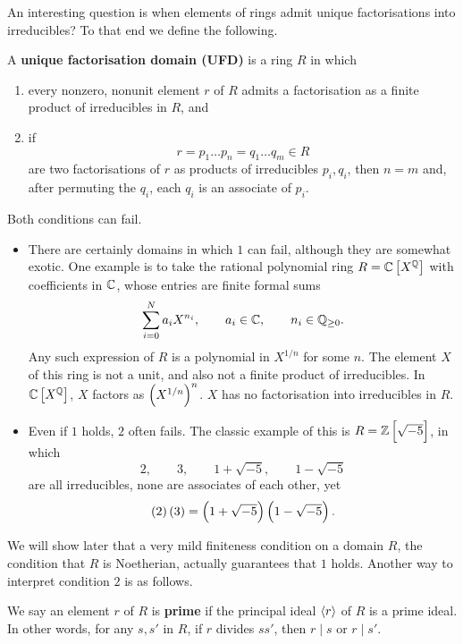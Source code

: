 An interesting question is when elements of rings admit unique factorisations into irreducibles? To that end we define the following.

\begin{definition}
A \textbf{unique factorisation domain (UFD)} is a ring $ R $ in which
\begin{enumerate}
\item every nonzero, nonunit element $ r $ of $ R $ admits a factorisation as a finite product of irreducibles in $ R $, and
\item if
$$ r = p_1 \dots p_n = q_1 \dots q_m \in R $$
are two factorisations of $ r $ as products of irreducibles $ p_i, q_i $, then $ n = m $ and, after permuting the $ q_i $, each $ q_i $ is an associate of $ p_i $.
\end{enumerate}
\end{definition}

Both conditions can fail.

\begin{example*}
\hfill
\begin{itemize}
\item There are certainly domains in which $ 1 $ can fail, although they are somewhat exotic. One example is to take the rational polynomial ring $ R = \C\sbr{X^\Q} $ with coefficients in $ \mathbb{C} $, whose entries are finite formal sums
$$ \sum_{i = 0}^N a_iX^{n_i}, \qquad a_i \in \mathbb{C}, \qquad n_i \in \mathbb{Q}_{\ge 0}. $$
Any such expression of $ R $ is a polynomial in $ X^{1 / n} $ for some $ n $. The element $ X $ of this ring is not a unit, and also not a finite product of irreducibles. In $ \C\sbr{X^\Q} $, $ X $ factors as $ \br{X^{1 / n}}^n $. $ X $ has no factorisation into irreducibles in $ R $.
\item Even if $ 1 $ holds, $ 2 $ often fails. The classic example of this is $ R = \Z\sbr{\sqrt{-5}} $, in which
$$ 2, \qquad 3, \qquad 1 + \sqrt{-5}, \qquad 1 - \sqrt{-5} $$
are all irreducibles, none are associates of each other, yet
$$ \br{2}\br{3} = \br{1 + \sqrt{-5}}\br{1 - \sqrt{-5}}. $$
\end{itemize}
\end{example*}

\pagebreak

We will show later that a very mild finiteness condition on a domain $ R $, the condition that $ R $ is Noetherian, actually guarantees that $ 1 $ holds. Another way to interpret condition $ 2 $ is as follows.

\begin{definition}
We say an element $ r $ of $ R $ is \textbf{prime} if the principal ideal $ \left\langle r \right\rangle $ of $ R $ is a prime ideal. In other words, for any $ s, s' $ in $ R $, if $ r $ divides $ ss' $, then $ r \mid s $ or $ r \mid s' $.
\end{definition}

